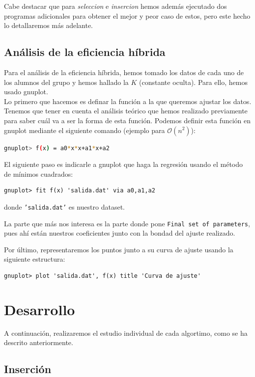 \documentclass[10pt,a4paper]{article}
\begin{document}
Cabe destacar que para \textit{seleccion} e \textit{insercion} hemos además ejecutado dos programas adicionales para obtener el mejor y peor caso de estos, pero este hecho lo detallaremos más adelante. \\

\subsection{Análisis de la eficiencia híbrida}
Para el análisis de la eficiencia híbrida, hemos tomado los datos de cada uno de los alumnos del grupo y hemos hallado la \(K\) (constante oculta). Para ello, hemos usado gnuplot. \\

Lo primero que hacemos es definar la función a la que queremos ajustar los datos. Tenemos que tener en cuenta el análisis teórico que hemos realizado previamente para saber cuál va a ser la forma de esta función. Podemos definir esta función en gnuplot mediante el siguiente comando (ejemplo para \(\mathcal{O}(n^2)\)):
\begin{lstlisting}[language=bash]
gnuplot> f(x) = a0*x*x+a1*x+a2
\end{lstlisting}

El siguiente paso es indicarle a gnuplot que haga la regresión usando el método de mínimos cuadrados:
\begin{lstlisting}
gnuplot> fit f(x) 'salida.dat' via a0,a1,a2
\end{lstlisting}
donde \texttt{'salida.dat'} es nuestro dataset. 

La parte que más nos interesa es la parte donde pone \texttt{Final set of parameters}, pues ahí están nuestros coeficientes junto con la bondad del ajuste realizado.

Por último, representaremos los puntos junto a su curva de ajuste usando la siguiente estructura:

\begin{lstlisting}
gnuplot> plot 'salida.dat', f(x) title 'Curva de ajuste'
\end{lstlisting}

\section{Desarrollo}

A continuación, realizaremos el estudio individual de cada algortimo, como se ha descrito anteriormente.

\subsection{Inserción}
\scalebox{0.75}{

}
\end{document}

